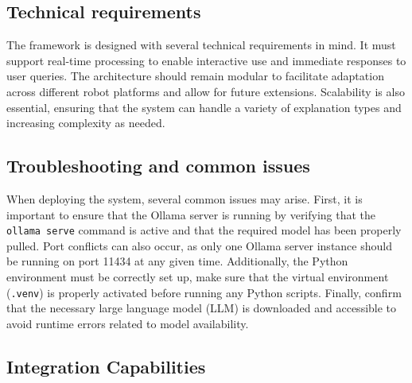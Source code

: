 \subsection{Technical requirements}

The framework is designed with several technical requirements in mind.
It must support real-time processing to enable interactive use and immediate responses to user queries.
The architecture should remain modular to facilitate adaptation across different robot platforms and allow for future extensions.
Scalability is also essential, ensuring that the system can handle a variety of explanation types and increasing complexity as needed.

\subsection{Troubleshooting and common issues}

When deploying the system, several common issues may arise. First, it is important to ensure that the Ollama server is running by verifying that the \texttt{ollama serve} command is active and that the required model has been properly pulled.
Port conflicts can also occur, as only one Ollama server instance should be running on port 11434 at any given time. Additionally, the Python environment must be correctly set up, make sure that the virtual environment (\texttt{.venv}) is properly activated before running any Python scripts.
Finally, confirm that the necessary large language model (LLM) is downloaded and accessible to avoid runtime errors related to model availability.
\subsection{Integration Capabilities}
